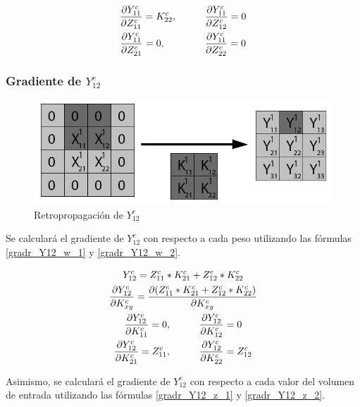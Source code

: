 \begin{gather}
	\frac{\partial Y^c_{11}}{\partial Z^c_{11}} = K^c_{22}, \hspace{10mm} \frac{\partial Y^c_{11}}{\partial Z^c_{12}} = 0 \label{gradr_Y11_z_1} \\
	\frac{\partial Y^c_{11}}{\partial Z^c_{21}} = 0, \hspace{14mm} \frac{\partial Y^c_{11}}{\partial Z^c_{22}} = 0 \label{gradr_Y11_z_2}
\end{gather}


\subsubsection{Gradiente de $Y^c_{12}$}

\begin{figure}[H]
	\centering
	\includegraphics[width=0.8\linewidth]{imagenes/conv_back_padding_2.jpg} 
	\caption{Retropropagación de $Y^c_{12}$}
\end{figure}

Se calculará el gradiente de $Y^c_{12}$ con respecto a cada peso utilizando las fórmulas \ref{gradr_Y12_w_1} y \ref{gradr_Y12_w_2}.

\begin{gather}
	Y^c_{12} = Z^c_{11} * K^c_{21} + Z^c_{12} * K^c_{22} \\
	\frac{\partial Y^c_{12}}{\partial K^c_{xy}} = \frac{\partial (Z^c_{11} * K^c_{21} + Z^c_{12} * K^c_{22})}{\partial K^c_{xy}} \\
	\frac{\partial Y^c_{12}}{\partial K^c_{11}} = 0, \hspace{10mm} \frac{\partial Y^c_{12}}{\partial K^c_{12}} = 0 \label{gradr_Y12_w_1} \\
	\frac{\partial Y^c_{12}}{\partial K^c_{21}} = Z^c_{11}, \hspace{10mm} \frac{\partial Y^c_{12}}{\partial K^c_{22}} = Z^c_{12} \label{gradr_Y12_w_2}
\end{gather}

Asimismo, se calculará el gradiente de $Y^c_{12}$ con respecto a cada valor del volumen de entrada utilizando las fórmulas \ref{gradr_Y12_z_1} y \ref{gradr_Y12_z_2}.

